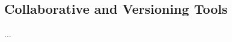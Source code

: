 \documentclass[a4paper,11pt]{book}
\newcommand{\question}[1]{%
    \begin{tcolorbox}[colback=comp_c!10,colframe=comp_c,sidebyside align=top,width=\linewidth,before skip=1ex]
        #1
    \end{tcolorbox}
    \switchcolumn%
}
\newcommand{\note}[1]{%
    \begin{tcolorbox}[colback=white!0,colframe=white!10,width=\linewidth,before skip=1ex]
        #1
    \end{tcolorbox}
}
\newcommand{\summary}[2][]{%
\begin{minipage}[b]{\textwidth}
    \vspace*{\baselineskip}
    \begin{tcolorbox}[colframe=tri_2!75,fonttitle=\large\bfseries\sffamily,
        after skip = \baselineskip,
        title=Summary]
        #2
    \end{tcolorbox}
\end{minipage}
#1}
\begin{document}
\begin{appendices}
\chapter{Collaborative and Versioning Tools}

...

\end{appendices}


%
%
%
%
%
%        
%
%
%    
%
%    
%
%
    
\end{document}
